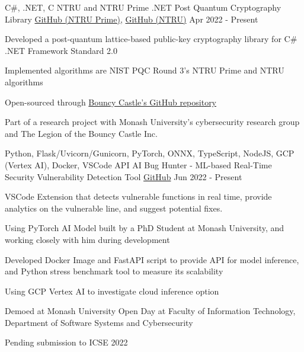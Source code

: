 




\begin{cventries}

  \cventry
  {C\#, .NET, C}
  {NTRU and NTRU Prime .NET Post Quantum Cryptography Library}
  {\href{https://github.com/bcgit/bc-csharp/tree/master/crypto/src/pqc/crypto/ntruprime}{GitHub (NTRU Prime)}, \href{https://github.com/bcgit/bc-csharp/tree/master/crypto/src/pqc/crypto/ntru}{GitHub (NTRU)}} %
  {Apr 2022 - Present}
  {
    \begin{cvitems}
      \item {Developed a post-quantum lattice-based public-key cryptography library for C\# .NET Framework Standard 2.0}
      \item {Implemented algorithms are NIST PQC Round 3's NTRU Prime and NTRU algorithms}
      \item {Open-sourced through \href{https://github.com/bcgit/bc-csharp}{Bouncy Castle's GitHub repository}}
      \item {Part of a research project with Monash University's cybersecurity research group and The Legion of the Bouncy Castle Inc.}
    \end{cvitems}
  }

  \cventry
  {Python, Flask/Uvicorn/Gunicorn, PyTorch, ONNX, TypeScript, NodeJS, GCP (Vertex AI), Docker, VSCode API}
  {AI Bug Hunter - ML-based Real-Time Security Vulnerability Detection Tool}
  {\href{https://github.com/aibughunter/aibughunter}{GitHub}} %
  {Jun 2022 - Present}
  {
    \begin{cvitems}
      \item {VSCode Extension that detects vulnerable functions in real time, provide analytics on the vulnerable line, and suggest potential fixes.}
      \item {Using PyTorch AI Model built by a PhD Student at Monash University, and working closely with him during development}
      \item {Developed Docker Image and FastAPI script to provide API for model inference, and Python stress benchmark tool to measure its scalability}
      \item {Using GCP Vertex AI to investigate cloud inference option}
      \item {Demoed at Monash University Open Day at Faculty of Information Technology, Department of Software Systems and Cybersecurity}
      \item {Pending submission to ICSE 2022}
    \end{cvitems}
  }


\end{cventries}
